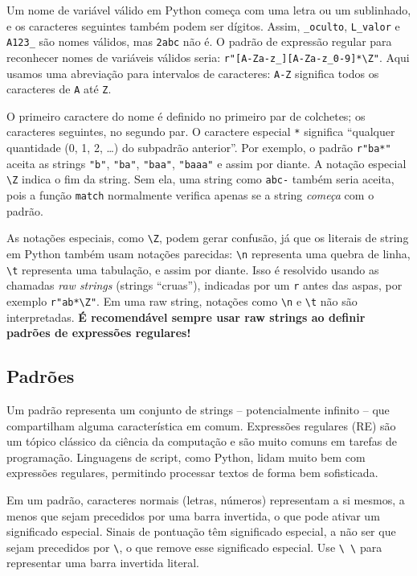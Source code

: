 \documentclass[11pt,a4paper]{article}
\begin{document}
Um nome de variável válido em Python começa com uma letra ou um
sublinhado, e os caracteres seguintes também podem ser dígitos. Assim,
\texttt{\_oculto}, \texttt{L\_valor} e \texttt{A123\_} são nomes válidos,
mas \texttt{2abc} não é. O padrão de expressão regular para reconhecer
nomes de variáveis válidos seria:
\texttt{r"[A-Za-z\_][A-Za-z\_0-9]*\textbackslash Z"}. Aqui usamos uma
abreviação para intervalos de caracteres: \texttt{A-Z} significa todos os
caracteres de \texttt{A} até \texttt{Z}.

O primeiro caractere do nome é definido no primeiro par de colchetes; os
caracteres seguintes, no segundo par. O caractere especial \texttt{*}
significa ``qualquer quantidade (0, 1, 2, \dots) do subpadrão anterior''.
Por exemplo, o padrão \texttt{r"ba*"} aceita as strings \texttt{"b"},
\texttt{"ba"}, \texttt{"baa"}, \texttt{"baaa"} e assim por diante. A
notação especial \texttt{\textbackslash Z} indica o fim da string. Sem
ela, uma string como \texttt{abc-} também seria aceita, pois a função
\texttt{match} normalmente verifica apenas se a string \emph{começa} com
o padrão.

As notações especiais, como \texttt{\textbackslash Z}, podem gerar
confusão, já que os literais de string em Python também usam notações
parecidas: \texttt{\textbackslash n} representa uma quebra de linha,
\texttt{\textbackslash t} representa uma tabulação, e assim por diante.
Isso é resolvido usando as chamadas \emph{raw strings} (strings
``cruas''), indicadas por um \texttt{r} antes das aspas, por exemplo
\texttt{r"ab*\textbackslash Z"}. Em uma raw string, notações como
\texttt{\textbackslash n} e \texttt{\textbackslash t} não são
interpretadas. \textbf{É recomendável sempre usar raw strings ao definir
padrões de expressões regulares!}

\subsection{Padrões}

Um padrão representa um conjunto de strings -- potencialmente infinito --
que compartilham alguma característica em comum. Expressões regulares
(RE) são um tópico clássico da ciência da computação e são muito comuns
em tarefas de programação. Linguagens de script, como Python, lidam muito
bem com expressões regulares, permitindo processar textos de forma bem
sofisticada.

Em um padrão, caracteres normais (letras, números) representam a si
mesmos, a menos que sejam precedidos por uma barra invertida, o que pode
ativar um significado especial. Sinais de pontuação têm significado
especial, a não ser que sejam precedidos por \texttt{\textbackslash}, o
que remove esse significado especial. Use \texttt{\textbackslash
\textbackslash} para representar uma barra invertida literal.
\end{document}
